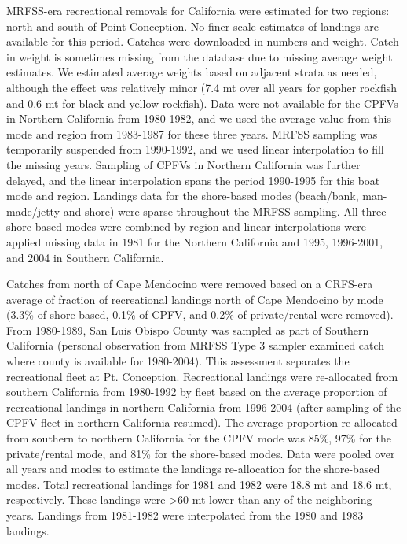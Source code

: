 \documentclass[12pt,]{article}
\begin{document}
MRFSS-era recreational removals for California were estimated for two
regions: north and south of Point Conception. No finer-scale estimates
of landings are available for this period. Catches were downloaded in
numbers and weight. Catch in weight is sometimes missing from the
database due to missing average weight estimates. We estimated average
weights based on adjacent strata as needed, although the effect was
relatively minor (7.4 mt over all years for gopher rockfish and 0.6 mt
for black-and-yellow rockfish). Data were not available for the CPFVs in
Northern California from 1980-1982, and we used the average value from
this mode and region from 1983-1987 for these three years. MRFSS
sampling was temporarily suspended from 1990-1992, and we used linear
interpolation to fill the missing years. Sampling of CPFVs in Northern
California was further delayed, and the linear interpolation spans the
period 1990-1995 for this boat mode and region. Landings data for the
shore-based modes (beach/bank, man-made/jetty and shore) were sparse
throughout the MRFSS sampling. All three shore-based modes were combined
by region and linear interpolations were applied missing data in 1981
for the Northern California and 1995, 1996-2001, and 2004 in Southern
California.

Catches from north of Cape Mendocino were removed based on a CRFS-era
average of fraction of recreational landings north of Cape Mendocino by
mode (3.3\% of shore-based, 0.1\% of CPFV, and 0.2\% of private/rental
were removed). From 1980-1989, San Luis Obispo County was sampled as
part of Southern California (personal observation from MRFSS Type 3
sampler examined catch where county is available for 1980-2004). This
assessment separates the recreational fleet at Pt. Conception.
Recreational landings were re-allocated from southern California from
1980-1992 by fleet based on the average proportion of recreational
landings in northern California from 1996-2004 (after sampling of the
CPFV fleet in northern California resumed). The average proportion
re-allocated from southern to northern California for the CPFV mode was
85\%, 97\% for the private/rental mode, and 81\% for the shore-based
modes. Data were pooled over all years and modes to estimate the
landings re-allocation for the shore-based modes. Total recreational
landings for 1981 and 1982 were 18.8 mt and 18.6 mt, respectively. These
landings were \textgreater{}60 mt lower than any of the neighboring
years. Landings from 1981-1982 were interpolated from the 1980 and 1983
landings.
\end{document}

